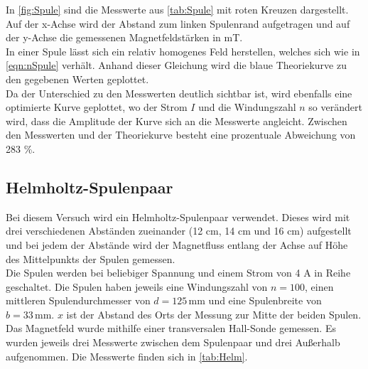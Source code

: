 In \autoref{fig:Spule} sind die Messwerte aus \autoref{tab:Spule} mit roten Kreuzen dargestellt. Auf der
x-Achse wird der Abstand zum linken Spulenrand aufgetragen und auf der y-Achse die gemessenen Magnetfeldstärken
in mT. \\
In einer Spule lässt sich ein relativ homogenes Feld herstellen, welches sich wie in \autoref{eqn:nSpule}
verhält. Anhand dieser Gleichung wird die blaue Theoriekurve zu den gegebenen Werten geplottet.\\
Da der Unterschied zu den Messwerten deutlich sichtbar ist, wird ebenfalls eine optimierte Kurve geplottet,
wo der Strom $I$ und die Windungszahl $n$ so verändert wird, dass die Amplitude der Kurve sich an
die Messwerte angleicht. Zwischen den Messwerten und der Theoriekurve besteht eine prozentuale Abweichung 
von 283 \%. \\

\subsection{Helmholtz-Spulenpaar}

Bei diesem Versuch wird ein Helmholtz-Spulenpaar verwendet. Dieses wird mit drei verschiedenen Abständen 
zueinander (12 cm, 14 cm und 16 cm) aufgestellt und bei jedem der Abstände wird der Magnetfluss entlang
der Achse auf Höhe des Mittelpunkts der Spulen gemessen.\\
Die Spulen werden bei beliebiger Spannung und einem Strom von 4 A in Reihe geschaltet. Die Spulen haben 
jeweils eine Windungszahl von $n = 100$, einen mittleren Spulendurchmesser von $d=125 \, \unit{\mm}$ und eine Spulenbreite
von $b=33 \, \unit{\mm}$. $x$ ist der Abstand des Orts der Messung zur Mitte der beiden Spulen.\\
Das Magnetfeld wurde mithilfe einer transversalen Hall-Sonde gemessen. Es wurden jeweils drei Messwerte
zwischen dem Spulenpaar und drei Außerhalb aufgenommen. Die Messwerte finden sich in \autoref{tab:Helm}.


